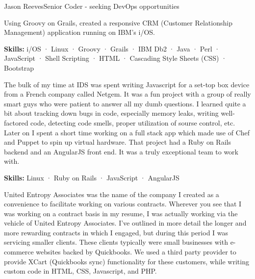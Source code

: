 \documentclass{article}
\begin{document}
\begin{cv}[avatar]{Jason Reeves}{Senior Coder - seeking DevOps opportunities}
\begin{cvevent}[Jul 2013][Sep 2016]
  Using Groovy on Grails, created a responsive CRM (Customer Relationship Management) application running on IBM's i/OS.
  
  \vspace*{3mm}
  \textbf{Skills:} i/OS · Linux · Groovy · Grails · IBM Db2 · Java · Perl · JavaScript · Shell Scripting · HTML · Cascading Style Sheets (CSS) · Bootstrap
  \vspace*{5mm}
\end{cvevent}

\begin{cvevent}[Jul 2011][Oct 2015]
  The bulk of my time at IDS was spent writing Javascript for a set-top box device from a French company called Netgem. It was a fun project with a group of really smart guys who were patient to answer all my dumb questions. I learned quite a bit about tracking down bugs in code, especially memory leaks, writing well-factored code, detecting code smells, proper utilization of sourse control, etc. Later on I spent a short time working on a full stack app which made use of Chef and Puppet to spin up virtual hardware. That project had a Ruby on Rails backend and an AngularJS front end. It was a truly exceptional team to work with.  
  
  \vspace*{3mm}
  \textbf{Skills:} Linux · Ruby on Rails · JavaScript · AngularJS
  \vspace*{5mm}
\end{cvevent}

\begin{cvevent}[Feb 2009][Jul 2011]
  United Entropy Associates was the name of the company I created as a convenience to facilitate working on various contracts. Wherever you see that I was working on a contract basis in my resume, I was actually working via the vehicle of United Entropy Associates. I've outlined in more detail the longer and more rewarding contracts in which I engaged, but during this period I was servicing smaller clients. These clients typically were small businesses with e-commerce websites backed by Quickbooks. We used a third party provider to provide XCart (Quickbooks sync) functionality for these customers, while writing custom code in HTML, CSS, Javascript, and PHP.
  

\end{cvevent}
\end{cv}
\end{document}
